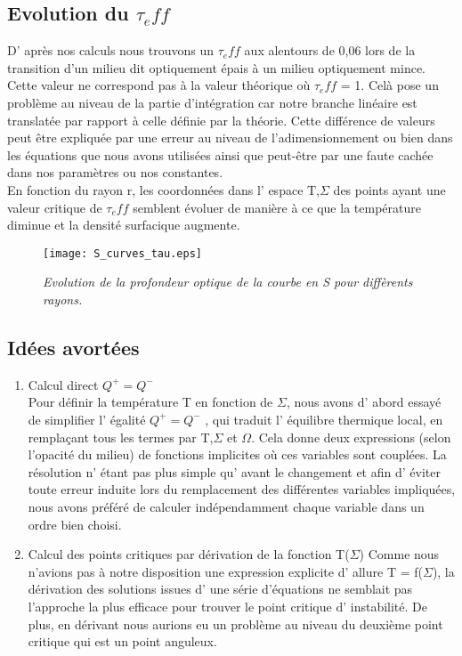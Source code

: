 \subsection{Evolution du $\tau_eff$}

D' après nos calculs nous trouvons un $\tau_eff$ aux alentours de 0,06 lors de la transition d'un milieu dit optiquement épais à un milieu optiquement mince. Cette valeur ne correspond pas à la valeur théorique où $\tau_eff$ = 1. 
Celà pose un problème au niveau de la partie d'intégration car notre branche linéaire est translatée par rapport à celle définie par la théorie. 
Cette différence de valeurs peut être expliquée par une erreur au niveau de l’adimensionnement ou bien dans les équations que nous avons utilisées ainsi que peut-être par une faute cachée dans nos paramètres ou nos constantes. 
\\
En fonction du rayon r, les coordonnées dans l' espace {T,$\Sigma$} des points ayant une valeur critique de $\tau_eff$ semblent évoluer de manière à ce que la température diminue et la densité surfacique augmente.

\begin{figure}[htb!]
	\centering
	\texttt{[image: S\_curves\_tau.eps]}
	\caption{\textit{Evolution de la profondeur optique de la courbe en S pour diffèrents rayons.}  }
	\label{Fig::bench}
\end{figure}

\subsection{Idées avortées}
\begin{enumerate}

\item Calcul direct $Q^+ = Q^-$
\\
Pour définir la température T en fonction de $\Sigma$, nous avons d' abord essayé de simplifier l' égalité $Q^+ = Q^-$ , qui traduit l' équilibre thermique local, en remplaçant tous les termes par T,$\Sigma$ et $\Omega$. Cela donne deux expressions (selon l'opacité du milieu) de fonctions implicites où ces variables sont couplées.
La résolution n' étant pas plus simple qu' avant le changement et afin d' éviter toute erreur induite lors du remplacement des différentes variables impliquées, nous avons préféré de calculer indépendamment chaque variable dans un ordre bien choisi. 
\\

\item Calcul des points critiques par dérivation de la fonction T($\Sigma$)
Comme nous n'avions pas à notre disposition une expression explicite d' allure T = f($\Sigma$), la dérivation des solutions issues d' une série d'équations ne semblait pas l'approche la plus efficace pour trouver le point critique d' instabilité. De plus, en dérivant nous aurions eu un problème au niveau du deuxième point critique qui est un point anguleux.
\end{enumerate}


